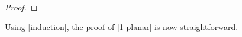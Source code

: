 \documentclass{patmorin}
\newcommand{\note}[2]{\noindent{\color{red}[#1:~#2]}}
\newcommand{\PP}{\mathcal{P}}
\begin{document}
\begin{proof}
\end{proof}

Using \cref{induction}, the proof of \cref{1-planar} is now straightforward.
\end{document}
